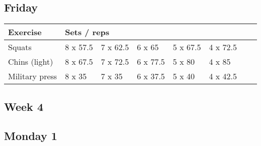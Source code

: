\documentclass[12pt, a4paper]{article}%
\begin{document}
  \subsection*{\hspace{0.5em} Friday }


  \begin{tabular}{l|lllllll}
  \hspace{0.75em} \textbf{Exercise} & \multicolumn{ 7 }{l}{ \textbf{Sets / reps} } \\ \hline

            \hspace{0.75em} Squats
            & 8 x 57.5
            & 7 x 62.5
            & 6 x 65
            & 5 x 67.5
            & 4 x 72.5
            & 
            & 
            \\


            \hspace{0.75em} Chins (light)
            & 8 x 67.5
            & 7 x 72.5
            & 6 x 77.5
            & 5 x 80
            & 4 x 85
            & 
            & 
            \\


            \hspace{0.75em} Military press
            & 8 x 35
            & 7 x 35
            & 6 x 37.5
            & 5 x 40
            & 4 x 42.5
            & 
            & 
            \\


  \end{tabular}


\clearpage \subsection*{\hspace{0.25em} Week 4 }
  \subsection*{\hspace{0.5em} Monday 1 }
\end{document}
